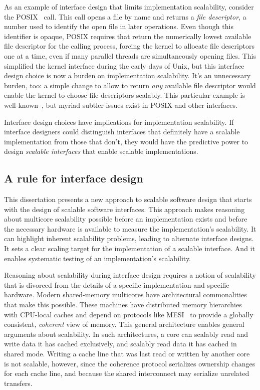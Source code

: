 As an example of interface design that limits implementation
scalability, consider the POSIX~\cite{posix2013}  call.
%
This call opens a
file by name and returns a \emph{file descriptor}, a number used to
identify the open file in later operations.
%
Even though this identifier is opaque, POSIX requires that 
return the numerically lowest available file descriptor for the
calling process, forcing the kernel to allocate file descriptors one
at a time, even if many parallel threads are simultaneously opening
files.
%
This simplified the kernel interface during the early days of Unix,
but this interface design choice is now a burden on implementation
scalability.
%
It's an unnecessary burden, too: a simple change to allow 
to return \emph{any} available file descriptor would enable the kernel
to choose file descriptors scalably.
%
This particular example is well-known~\cite{boyd-wickizer:corey}, but
myriad subtler issues exist in POSIX and other interfaces.

Interface design choices have implications for implementation
scalability.
%
If interface designers could distinguish interfaces that definitely
have a scalable implementation from those that don't, they would have
the predictive power to design \emph{scalable interfaces} that enable
scalable implementations.


\subsection{A rule for interface design}

This dissertation presents a new approach to scalable software design
that starts with the design of scalable software interfaces.
%
This approach makes reasoning about multicore scalability possible before an
implementation exists and before the necessary hardware is available
to measure the implementation's scalability.
%
It can highlight inherent scalability problems, leading to alternate
interface designs.
%
It sets a clear scaling target for the implementation of a
scalable interface.  And it enables systematic testing of an
implementation's scalability.

Reasoning about scalability during interface design requires a notion
of scalability that is divorced from the details of a specific
implementation and specific hardware.
%
Modern shared-memory multicores have architectural commonalities that
make this possible.  These machines have distributed memory
hierarchies with CPU-local caches and depend on protocols like
MESI~\cite{papamarcos:mesi} to provide a globally consistent,
\emph{coherent} view of memory.  This general architecture enables
general arguments about scalability.
%
In such architectures, a core can scalably read and write data it has
cached exclusively, and scalably read data it has cached in shared
mode. Writing a cache line that was last read or written by another
core is not scalable, however, since the coherence protocol serializes
ownership changes for each cache line, and because the shared
interconnect may serialize unrelated transfers.

